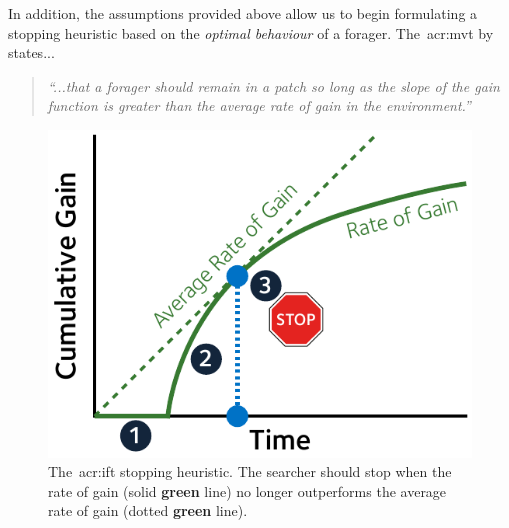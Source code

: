 
In addition, the assumptions provided above allow us to begin formulating a stopping heuristic based on the \emph{optimal behaviour} of a forager. The~\gls{acr:mvt} by~\cite{charnov1976mvt} states...

\begin{quote}
    \emph{``...that a forager should remain in a patch so long as the slope of the gain function is greater than the average rate of gain in the environment.''}
\end{quote}

\begin{figure}
    \begin{center}
    \vspace*{-11mm}
    \includegraphics[width=1\textwidth]{figures/ch3-ift_stop.pdf}
    \end{center}
    \vspace*{-6mm}
    \caption[Optimal \gls{acr:ift} stopping heuristic]{The~\gls{acr:ift} stopping heuristic. The searcher should stop when the rate of gain (solid \textbf{\color{dmax_green}green} line) no longer outperforms the average rate of gain (dotted \textbf{\color{dmax_green}green} line).}
    \label{fig:ift_stopping}
\end{figure}


